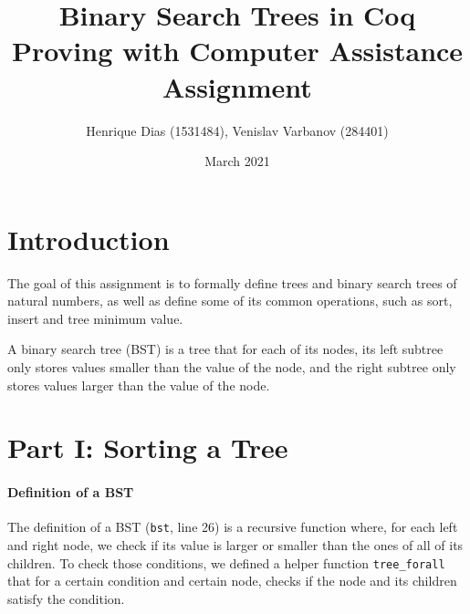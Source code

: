 \documentclass[a4paper]{article}
\title{%
  Binary Search Trees in Coq \\
  \large Proving with Computer Assistance Assignment}
\author{Henrique Dias (1531484), Venislav Varbanov (284401)}
\date{March 2021}
\begin{document}
\maketitle

\section{Introduction}

The goal of this assignment is to formally define trees and binary search trees of natural numbers, as well as define some of its common operations, such as sort, insert and tree minimum value.

A binary search tree (BST) is a tree that for each of its nodes, its left subtree only stores values smaller than the value of the node, and the right subtree only stores values larger than the value of the node.



\section{Part I: Sorting a Tree}

\paragraph{Definition of a BST}

The definition of a BST (\texttt{bst}, line 26) is a recursive function where, for each left and right node, we check if its value is larger or smaller than the ones of all of its children. To check those conditions, we defined a helper function \texttt{tree\_forall} that for a certain condition and certain node, checks if the node and its children satisfy the condition.
\end{document}
